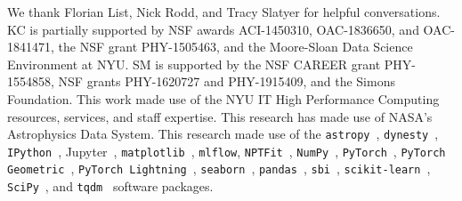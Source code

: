 \documentclass[prd,aps,10pt,nofootinbib,twocolumn,superscriptaddress,preprintnumbers,balancelastpage,longbibliography]{revtex4-1}
\begin{document}
\begin{acknowledgments}

We thank Florian List, Nick Rodd, and Tracy Slatyer for helpful conversations.  
KC is partially supported by NSF awards ACI-1450310, OAC-1836650, and OAC-1841471, the NSF grant PHY-1505463, and the Moore-Sloan Data Science Environment at NYU. 
SM is supported by the NSF CAREER grant PHY-1554858, NSF grants PHY-1620727 and PHY-1915409, and the Simons Foundation. 
This work made use of the NYU IT High Performance Computing resources, services, and staff expertise. 
This research has made use of NASA's Astrophysics Data System. 
This research made use of the \texttt{astropy}~\cite{Price-Whelan:2018hus,Robitaille:2013mpa}, \texttt{dynesty}~\cite{Speagle_2020}, \texttt{IPython}~\cite{PER-GRA:2007}, Jupyter~\cite{Kluyver2016JupyterN}, \texttt{matplotlib}~\cite{Hunter:2007}, \texttt{mlflow}, \texttt{NPTFit}~\cite{Mishra-Sharma:2016gis}, \texttt{NumPy}~\cite{numpy:2011}, \texttt{PyTorch}~\cite{NEURIPS2019_9015}, \texttt{PyTorch Geometric}~\cite{Fey/Lenssen/2019}, \texttt{PyTorch Lightning}~\cite{william_falcon_2020_3828935}, \texttt{seaborn}~\cite{seaborn}, \texttt{pandas}~\cite{pandas:2010}, \texttt{sbi}~\cite{tejero-cantero2020sbi}, \texttt{scikit-learn}~\cite{scikit-learn}, \texttt{SciPy}~\cite{2020SciPy-NMeth}, and \texttt{tqdm}~\cite{da2019tqdm}  software packages. 
\end{acknowledgments}





\end{document}
